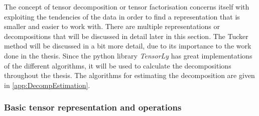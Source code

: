 The concept of tensor decomposition or tensor factorisation concerns itself with exploiting the tendencies of the data in order to find a representation that is smaller and easier to work with. There are multiple representations or decompositions that will be discussed in detail later in this section. The Tucker method will be discussed in a bit more detail, due to its importance to the work done in the thesis. Since the python library \textit{TensorLy} has great implementations of the different algorithms, it will be used to calculate the decompositions throughout the thesis. The algorithms for estimating the decomposition are given in \autoref{app:DecompEstimation}.

\subsubsection{Basic tensor representation and operations} \label{tex:tensor_operations}
